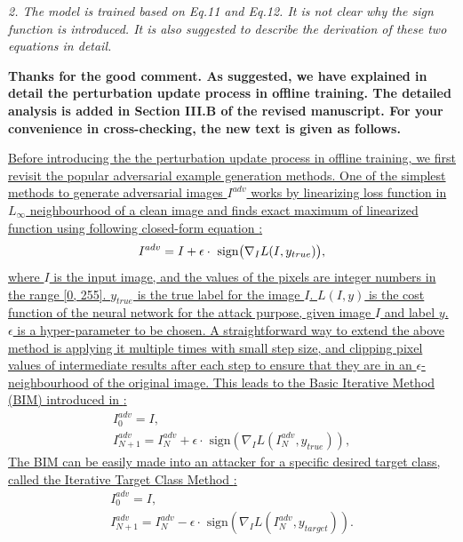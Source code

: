 \documentclass[12pt]{article}
\begin{document}
\textit{2. The model is trained based on Eq.11 and Eq.12. It is not clear why the sign function is introduced. It is also suggested to describe the derivation of these two equations in detail.}

\textbf{Thanks for the good comment. As suggested, we have explained in detail the perturbation update process in offline training.
The detailed analysis is added in Section III.B of the revised manuscript.
For your convenience in cross-checking, the new text is given as follows.}

\uline{Before introducing the the perturbation update process in offline training, we first revisit the popular adversarial example generation methods. One of the simplest methods to generate adversarial images $I^{adv}$ works by linearizing loss function in $L_{\infty}$ neighbourhood of a clean image and finds exact maximum of linearized function using following closed-form equation \cite{FGSM}:}
\begin{equation}
    I^{adv} = I + \epsilon \cdot \text{ sign} \bigl( \nabla_I L(I, y_{true})  \bigr),
    \vspace{-0.1cm}
\end{equation}
\uline{where $I$ is the input image, and the values of the pixels are integer numbers in the range [0, 255]. $y_{true}$ is the true label for the image $I$. $L(I, y)$ is the cost function of the neural network for the attack purpose, given image $I$ and label $y$. $\epsilon$ is a hyper-parameter to be chosen. A straightforward way to extend the above method is applying it multiple times with small step size, and clipping pixel values of intermediate results after each step to ensure that they are in an $\epsilon$-neighbourhood of the original image.  This leads to the Basic Iterative Method (BIM) introduced in \cite{kurakin2017adversarial}:}
\begin{equation}
    \begin{gathered}
        I_0^{adv} = I, \\
        I_{N+1}^{adv} = I_N^{adv}+\epsilon \cdot \text{ sign}(\nabla_I L(I_N^{adv},y_{true})),
    \end{gathered}
\end{equation}
\uline{The BIM can be easily made into an attacker for a specific desired target class, called the Iterative Target Class Method \cite{kurakin2017adversarial}:}
\begin{equation}
  \begin{gathered}
      I_0^{adv} = I,\\
      I_{N+1}^{adv} = I_N^{adv}-\epsilon \cdot \text{ sign}(\nabla_I L(I_N^{adv},y_{target})).
  \end{gathered}
  \label{equ:itcm}
\end{equation}
\end{document}
